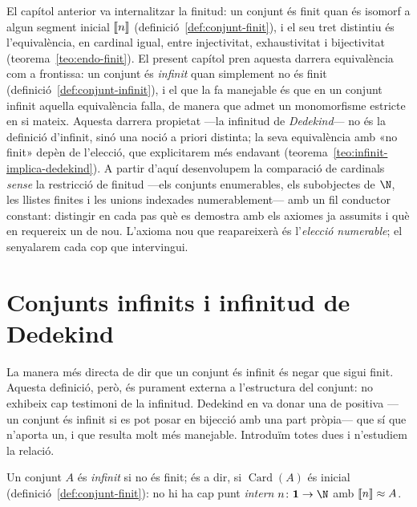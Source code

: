 El capítol anterior va internalitzar la finitud: un
conjunt és finit quan és isomorf a algun segment inicial \(\llbracket n\rrbracket\)
(definició~\ref{def:conjunt-finit}), i el seu tret distintiu és
l'equivalència, en cardinal igual, entre injectivitat, exhaustivitat i
bijectivitat (teorema~\ref{teo:endo-finit}). El present capítol pren
aquesta darrera equivalència com a frontissa: un conjunt és \emph{infinit}
quan simplement no és finit (definició~\ref{def:conjunt-infinit}), i el que
la fa manejable és que en un conjunt infinit aquella equivalència falla, de
manera que admet un monomorfisme estricte en si mateix. Aquesta darrera
propietat ---la infinitud de \emph{Dedekind}--- no és la definició
d'infinit, sinó una noció a priori distinta; la seva equivalència amb «no
finit» depèn de l'elecció, que explicitarem més endavant
(teorema~\ref{teo:infinit-implica-dedekind}). A partir d'aquí desenvolupem la
comparació de cardinals \emph{sense} la restricció de finitud ---els
conjunts enumerables, els subobjectes de \(\N\), les llistes finites i
les unions indexades numerablement--- amb un fil conductor constant:
distingir en cada pas què es demostra amb els axiomes ja assumits i què en
requereix un de nou. L'axioma nou que reapareixerà és l'\emph{elecció
numerable}; el senyalarem cada cop que intervingui.

\section{Conjunts infinits i infinitud de Dedekind}\label{sec:infinits}

La manera més directa de dir que un conjunt és infinit és negar que sigui
finit. Aquesta definició, però, és purament externa a l'estructura del
conjunt: no exhibeix cap testimoni de la infinitud. Dedekind en va donar
una de positiva ---un conjunt és infinit si es pot posar en bijecció amb
una part pròpia--- que sí que n'aporta un, i que resulta molt més
manejable. Introduïm totes dues i n'estudiem la relació.

\begin{definicio}\label{def:conjunt-infinit}
Un conjunt \(A\) és \emph{infinit} si no és finit; és a dir, si
\(\operatorname{Card}(A)\) és inicial (definició~\ref{def:conjunt-finit}):
no hi ha cap punt \emph{intern} \(n\colon\mathbf1\to\N\) amb
\(\llbracket n\rrbracket\approx A\).
\end{definicio}

